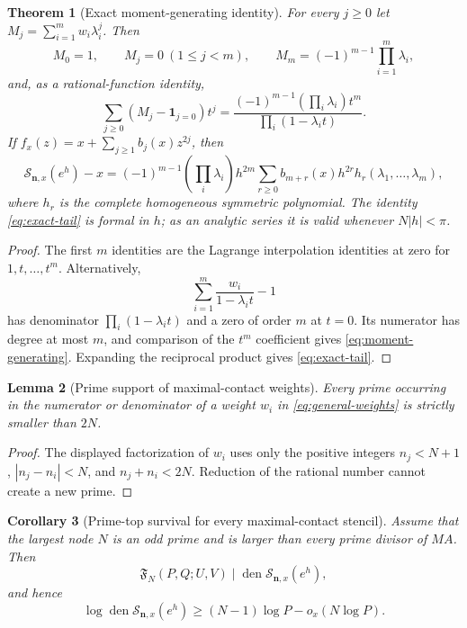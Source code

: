 \documentclass[11pt]{article}
\newtheorem{theorem}{Theorem}[section]
\newtheorem{lemma}[theorem]{Lemma}
\newtheorem{corollary}[theorem]{Corollary}
\theoremstyle{definition}
\newcommand{\den}{\operatorname{den}}
\begin{document}
\begin{theorem}[Exact moment-generating identity]
\label{thm:moment-generating}
For every $j\ge0$ let $M_j=\sum_{i=1}^m w_i\lambda_i^j$.  Then
\begin{equation}
 M_0=1,\qquad M_j=0\ (1\le j<m),\qquad
 M_m=(-1)^{m-1}\prod_{i=1}^m\lambda_i,
 \label{eq:moments}
\end{equation}
and, as a rational-function identity,
\begin{equation}
 \boxed{
 \sum_{j\ge0}(M_j-\mathbf1_{j=0})t^j
 =\frac{(-1)^{m-1}(\prod_i\lambda_i)t^m}
 {\prod_i(1-\lambda_i t)}.
 }
 \label{eq:moment-generating}
\end{equation}
If
$f_x(z)=x+\sum_{j\ge1}b_j(x)z^{2j}$, then
\begin{equation}
 \mathcal S_{\mathbf n,x}(e^h)-x
 =(-1)^{m-1}\left(\prod_i\lambda_i\right)h^{2m}
 \sum_{r\ge0}b_{m+r}(x)h^{2r}
 h_r(\lambda_1,\ldots,\lambda_m),
 \label{eq:exact-tail}
\end{equation}
where $h_r$ is the complete homogeneous symmetric polynomial.  The
identity \eqref{eq:exact-tail} is formal in $h$; as an analytic series it is
valid whenever $N|h|<\pi$.
\end{theorem}

\begin{proof}
The first $m$ identities are the Lagrange interpolation identities at zero for
$1,t,\ldots,t^{m}$.  Alternatively,
\[
 \sum_{i=1}^m\frac{w_i}{1-\lambda_i t}-1
\]
has denominator $\prod_i(1-\lambda_i t)$ and a zero of order $m$ at $t=0$.
Its numerator has degree at most $m$, and comparison of the $t^m$
coefficient gives \eqref{eq:moment-generating}.  Expanding the reciprocal
product gives \eqref{eq:exact-tail}.
\end{proof}

\begin{lemma}[Prime support of maximal-contact weights]
\label{lem:weight-support}
Every prime occurring in the numerator or denominator of a weight $w_i$ in
\eqref{eq:general-weights} is strictly smaller than $2N$.
\end{lemma}

\begin{proof}
The displayed factorization of $w_i$ uses only the positive integers
$n_j<N+1$, $|n_j-n_i|<N$, and $n_j+n_i<2N$.  Reduction of the rational
number cannot create a new prime.
\end{proof}

\begin{corollary}[Prime-top survival for every maximal-contact stencil]
\label{cor:all-stencil-survival}
Assume that the largest node $N$ is an odd prime and is larger than every
prime divisor of $MA$.  Then
\begin{equation}
 \mathfrak F_N(P,Q;U,V)
 \mid\den\mathcal S_{\mathbf n,x}(e^h),
 \label{eq:all-stencil-survival}
\end{equation}
and hence
\begin{equation}
 \log\den\mathcal S_{\mathbf n,x}(e^h)
 \ge(N-1)\log P-o_x(N\log P).
 \label{eq:all-stencil-den}
\end{equation}
\end{corollary}
\end{document}
